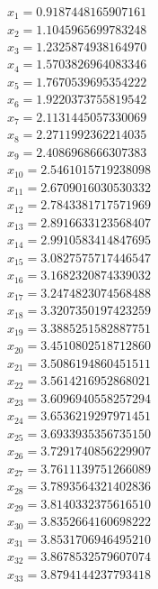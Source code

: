 \begin{multicols}{3}
	\begin{align*}
		x_{1}  = 0.9187448165907161\\
		x_{2}  = 1.1045965699783248\\
		x_{3}  = 1.2325874938164970\\
		x_{4}  = 1.5703826964083346\\
		x_{5}  = 1.7670539695354222\\
		x_{6}  = 1.9220373755819542\\
		x_{7}  = 2.1131445057330069\\
		x_{8}  = 2.2711992362214035\\
		x_{9}  = 2.4086968666307383\\
		x_{10} = 2.5461015719238098\\
		x_{11} = 2.6709016030530332\\
		x_{12} = 2.7843381717571969\\
		x_{13} = 2.8916633123568407\\
		x_{14} = 2.9910583414847695\\
		x_{15} = 3.0827575717446547\\
		x_{16} = 3.1682320874339032\\
		x_{17} = 3.2474823074568488\\
		x_{18} = 3.3207350197423259\\
		x_{19} = 3.3885251582887751\\
		x_{20} = 3.4510802518712860\\
		x_{21} = 3.5086194860451511\\
		x_{22} = 3.5614216952868021\\
		x_{23} = 3.6096940558257294\\
		x_{24} = 3.6536219297971451\\
		x_{25} = 3.6933935356735150\\
		x_{26} = 3.7291740856229907\\
		x_{27} = 3.7611139751266089\\
		x_{28} = 3.7893564321402836\\
		x_{29} = 3.8140332375616510\\
		x_{30} = 3.8352664160698222\\
		x_{31} = 3.8531706946495210\\
		x_{32} = 3.8678532579607074\\
		x_{33} = 3.8794144237793418\\
	\end{align*}
	\vfill
	\columnbreak
	\begin{align*}

\end{align*}
\end{multicols}
